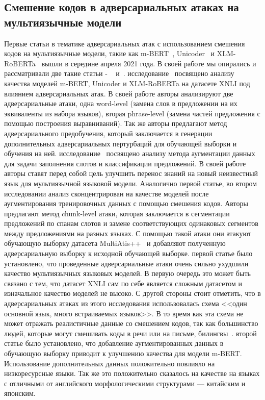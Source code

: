 \subsection{Смешение кодов в адверсариальных атаках на мультиязычные модели}
Первые статьи в тематике адверсариальных атак с использованием смешения кодов на мультиязычные модели, такие как m-BERT~\cite{devlin-etal-2019-bert}, Unicoder~\cite{huang-etal-2019-unicoder} и XLM-RoBERTa~\cite{Conneau2020UnsupervisedCR} вышли в середине апреля 2021 года.
В своей работе мы опирались и рассматривали две такие статьи - ~\cite{Tan2021CodeMixingOS} и~\cite{Krishnan2021MultilingualCF}.
 исследование~\cite{Tan2021CodeMixingOS} посвящено анализу качества моделей m-BERT, Unicoder и XLM-RoBERTa на датасете XNLI под влиянием адверсариальных атак.
В своей работе авторы анализируют две адверсариальные атаки, одна word-level (замена слов в предложении на их эквиваленты из набора языков), вторая phrase-level (замена частей предложения с помощью построения выравниваний).
Так же авторы предлагают метод адверсариального предобучения, который заключается в генерации дополнительных адверсариальных пертурбаций для обучающей выборки и обучения на ней.
 исследование~\cite{Krishnan2021MultilingualCF} посвящено анализу метода аугментации данных для задачи заполнения слотов и классификации предложений.
В своей работе авторы ставят перед собой цель улучшить перенос знаний на новый неизвестный язык для мультиязычной языковой модели.
Аналогично первой статье, во втором исследовании анализ сконцентрирован на качестве моделей после аугментирования тренировочных данных с помощью смешения кодов.
Авторы предлагают метод chunk-level атаки, которая заключается в сегментации предложений по спанам слотов и замене соответствующих одинаковых сегментов между предложениями на разных языках.
С помощью такой атаки они атакуют обучающую выборку датасета MultiAtis++~\cite{Xu2020EndtoEndSA} и добавляют полученную адверсариальную выборку к исходной обучающей выборке.
 первой статье было установлено, что проведенные адверсариальные атаки очень сильно ухудшили качество мультиязычных языковых моделей.
В первую очередь это может быть связано с тем, что датасет XNLI сам по себе является сложным датасетом и изначальное качество моделей не высоко.
С другой стороны стоит отметить, что в адверсариальных атаках из этого исследования использовалась схема <<один основной язык, много встраиваемых языков>>.
В то время как эта схема не может отражать реалистичные данные со смешением кодов, так как большинство людей, которые могут смешивать коды в речи или на письме, билингвы~\cite{bilinguals}.
 второй статье было установлено, что добавление аугментированных данных в обучающую выборку приводит к улучшению качества для модели m-BERT\@.
Использование дополнительных данных положительно повлияло на низкоресурсные языки.
Так же это положительно сказалось на качестве на языках с отличными от английского морфологическими структурами — китайским и японским.

